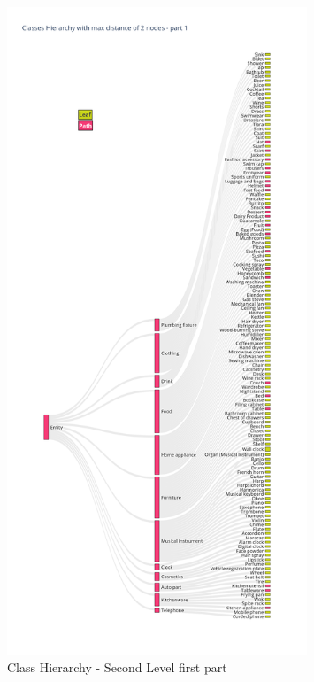 \documentclass[11pt, a4paper, twocolumn]{article}
\begin{document}
\begin{appendices}
	\begin{figure}[ht]
		\centering
		\includegraphics[width=0.8\textwidth]{lvl2_classes_pt1.png}
		\caption{\scriptsize Class Hierarchy - Second Level first part}
	\end{figure}
	\begin{figure}[ht]
		\centering

\end{figure}
\end{appendices}
\end{document}
